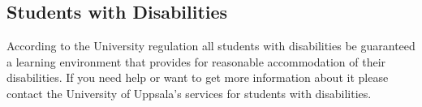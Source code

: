 \documentclass[a4paper,12pt]{article}
\begin{document}
\setlength{\leftskip}{0em}
\subsection*{Students with Disabilities}
\setlength{\leftskip}{1em} 
According to the University
regulation all students with disabilities be guaranteed a learning
environment that provides for reasonable accommodation of their
disabilities. If you need help or want to get more information about
it please contact the University of Uppsala's services for students
with disabilities.  
\end{document}
